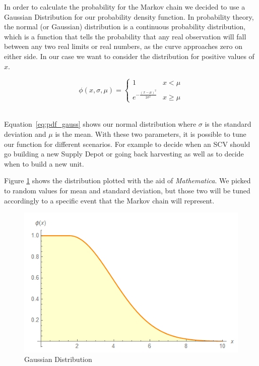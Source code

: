 In order to calculate the probability for the Markov chain we decided to use a Gaussian Distribution for our probability density function. In probability theory, the normal (or Gaussian) distribution is a continuous probability distribution, which is a function that tells the probability that any real observation will fall between any two real limits or real numbers, as the curve approaches zero on either side. In our case we want to consider the distribution for positive values of \(x\). 

\begin{center}
\begin{equation}
\label{eq:pdf_gauss}
\phi (x,\sigma,\mu) = 	\begin{cases}
							1 & x < \mu \\
							e^{-\frac{(x-\mu )^2}{2 \sigma ^2}} & x \geq \mu
						\end{cases}
\end{equation}
\end{center}
~\\

Equation~\ref{eq:pdf_gauss} shows our normal distribution where $\sigma$ is the standard deviation and $\mu$ is the mean. With these two parameters, it is possible to tune our function for different scenarios. For example to decide when an SCV should go building a new Supply Depot or going back harvesting as well as to decide when to build a new unit. 

Figure \ref{fig:gaussdistr} shows the distribution plotted with the aid of \textit{Mathematica}. We picked to random values for mean and standard deviation, but those two will be tuned accordingly to a specific event that the Markov chain will represent.

\begin{figure}[h]
\caption{Gaussian Distribution}
\centering
\label{fig:gaussdistr}
\includegraphics[scale=0.7]{images/Gaussian_Distribution.jpg}
\end{figure}
